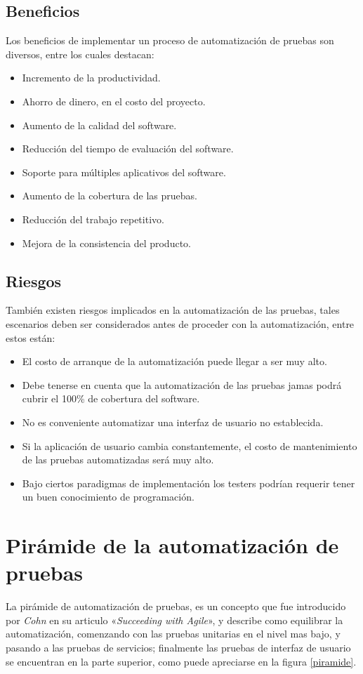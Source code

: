 \subsection{Beneficios}
Los beneficios de implementar un proceso de automatización de pruebas son
diversos, entre los cuales destacan:

\begin{itemize}
    \item Incremento de la productividad.
    \item Ahorro de dinero, en el costo del proyecto.
    \item Aumento de la calidad del software.
    \item Reducción del tiempo de evaluación del software.
    \item Soporte para múltiples aplicativos del software.
    \item Aumento de la cobertura de las pruebas.
    \item Reducción del trabajo repetitivo.
    \item Mejora de la consistencia del producto.
\end{itemize}

\subsection{Riesgos}
También existen riesgos implicados en la automatización de las pruebas, tales
escenarios deben ser considerados antes de proceder con la automatización, entre
estos están:

\begin{itemize}
    \item El costo de arranque de la automatización puede llegar a ser muy alto.
    \item Debe tenerse en cuenta que la automatización de las pruebas jamas
        podrá cubrir el 100\% de cobertura del software.
    \item No es conveniente automatizar una interfaz de usuario no establecida.
    \item Si la aplicación de usuario cambia constantemente, el costo de
        mantenimiento de las pruebas automatizadas será muy alto.
    \item Bajo ciertos paradigmas de implementación los testers podrían requerir
        tener un buen conocimiento de programación.
\end{itemize}

\section{Pirámide de la automatización de pruebas}
La pirámide de automatización de pruebas, es un concepto que fue introducido
por \emph{Cohn} en su articulo «\emph{Succeeding with Agile}», y describe como
equilibrar la automatización, comenzando con las pruebas unitarias en el nivel
mas bajo, y pasando a las pruebas de servicios; finalmente las pruebas de
interfaz de usuario se encuentran en la parte superior, como puede apreciarse en
la figura \ref{piramide}.

